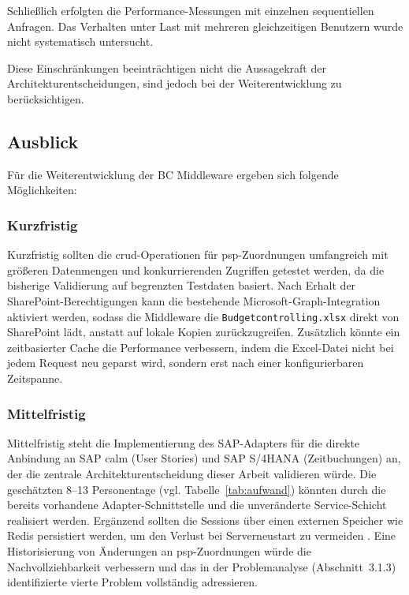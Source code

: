 Schließlich erfolgten die Performance-Messungen mit einzelnen sequentiellen Anfragen. Das Verhalten unter Last mit mehreren gleichzeitigen Benutzern wurde nicht systematisch untersucht.

Diese Einschränkungen beeinträchtigen nicht die Aussagekraft der Architekturentscheidungen, sind jedoch bei der Weiterentwicklung zu berücksichtigen.

\subsection{Ausblick}

Für die Weiterentwicklung der BC Middleware ergeben sich folgende Möglichkeiten:

\subsubsection{Kurzfristig}

Kurzfristig sollten die \gls{crud}-Operationen für \gls{psp}-Zuordnungen umfangreich mit größeren Datenmengen und konkurrierenden Zugriffen getestet werden, da die bisherige Validierung auf begrenzten Testdaten basiert. Nach Erhalt der SharePoint-Berechtigungen kann die bestehende Microsoft-Graph-Integration aktiviert werden, sodass die Middleware die \texttt{Budgetcontrolling.xlsx} direkt von SharePoint lädt, anstatt auf lokale Kopien zurückzugreifen. Zusätzlich könnte ein zeitbasierter Cache die Performance verbessern, indem die Excel-Datei nicht bei jedem Request neu geparst wird, sondern erst nach einer konfigurierbaren Zeitspanne.

\subsubsection{Mittelfristig}

Mittelfristig steht die Implementierung des SAP-Adapters für die direkte Anbindung an SAP \gls{calm} (User Stories) und SAP S/4HANA (Zeitbuchungen) an, der die zentrale Architekturentscheidung dieser Arbeit validieren würde. Die geschätzten 8--13 Personentage (vgl. Tabelle~\ref{tab:aufwand}) könnten durch die bereits vorhandene Adapter-Schnittstelle und die unveränderte Service-Schicht realisiert werden. Ergänzend sollten die Sessions über einen externen Speicher wie Redis persistiert werden, um den Verlust bei Serverneustart zu vermeiden \citep{richardson2018}. Eine Historisierung von Änderungen an \gls{psp}-Zuordnungen würde die Nachvollziehbarkeit verbessern und das in der Problemanalyse (Abschnitt~3.1.3) identifizierte vierte Problem vollständig adressieren.

